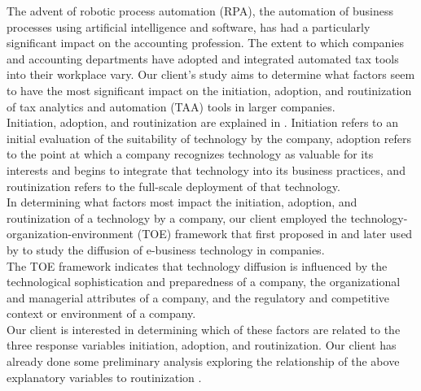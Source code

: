 \documentclass[12pt]{article}
\begin{document}
The advent of robotic process automation (RPA), the automation of business processes using artificial intelligence and software, has had a particularly significant impact on the accounting profession. \cite{mezzio2019robotic} The extent to which companies and accounting departments have adopted and integrated automated tax tools into their workplace vary. Our client's study aims to determine what factors seem to have the most significant impact on the initiation, adoption, and routinization of tax analytics and automation (TAA) tools in larger companies. \\

Initiation, adoption, and routinization are explained in \cite{cooper1990information}.  Initiation refers to an initial evaluation of the suitability of technology by the company, adoption refers to the point at which a company recognizes technology as valuable for its interests and begins to integrate that technology into its business practices, and routinization refers to the full-scale deployment of that technology. \\

In determining what factors most impact the initiation, adoption, and routinization of a technology by a company, our client employed the technology-organization-environment (TOE) framework that first proposed in \cite{tornatzky1990process} and later used by \cite{zhu2006process} to study the diffusion of e-business technology in companies.\\

The TOE framework indicates that technology diffusion is influenced by the technological sophistication and preparedness of a company, the organizational and managerial attributes of a company, and the regulatory and competitive context or environment of a company. \\



Our client is interested in determining which of these factors are related to the three response variables initiation, adoption, and routinization. Our client has already done some preliminary analysis exploring the relationship of the above explanatory variables to routinization \cite{chen2020technology}. \\
\end{document}
